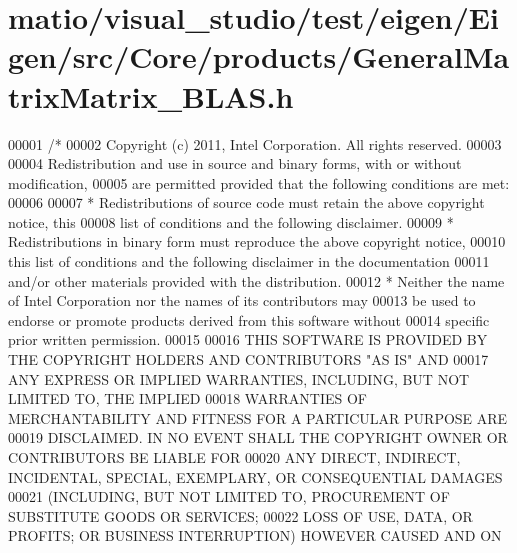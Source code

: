 \hypertarget{matio_2visual__studio_2test_2eigen_2_eigen_2src_2_core_2products_2_general_matrix_matrix___b_l_a_s_8h_source}{}\section{matio/visual\+\_\+studio/test/eigen/\+Eigen/src/\+Core/products/\+General\+Matrix\+Matrix\+\_\+\+B\+L\+AS.h}
\label{matio_2visual__studio_2test_2eigen_2_eigen_2src_2_core_2products_2_general_matrix_matrix___b_l_a_s_8h_source}

\begin{DoxyCode}
00001 \textcolor{comment}{/*}
00002 \textcolor{comment}{ Copyright (c) 2011, Intel Corporation. All rights reserved.}
00003 \textcolor{comment}{}
00004 \textcolor{comment}{ Redistribution and use in source and binary forms, with or without modification,}
00005 \textcolor{comment}{ are permitted provided that the following conditions are met:}
00006 \textcolor{comment}{}
00007 \textcolor{comment}{ * Redistributions of source code must retain the above copyright notice, this}
00008 \textcolor{comment}{   list of conditions and the following disclaimer.}
00009 \textcolor{comment}{ * Redistributions in binary form must reproduce the above copyright notice,}
00010 \textcolor{comment}{   this list of conditions and the following disclaimer in the documentation}
00011 \textcolor{comment}{   and/or other materials provided with the distribution.}
00012 \textcolor{comment}{ * Neither the name of Intel Corporation nor the names of its contributors may}
00013 \textcolor{comment}{   be used to endorse or promote products derived from this software without}
00014 \textcolor{comment}{   specific prior written permission.}
00015 \textcolor{comment}{}
00016 \textcolor{comment}{ THIS SOFTWARE IS PROVIDED BY THE COPYRIGHT HOLDERS AND CONTRIBUTORS "AS IS" AND}
00017 \textcolor{comment}{ ANY EXPRESS OR IMPLIED WARRANTIES, INCLUDING, BUT NOT LIMITED TO, THE IMPLIED}
00018 \textcolor{comment}{ WARRANTIES OF MERCHANTABILITY AND FITNESS FOR A PARTICULAR PURPOSE ARE}
00019 \textcolor{comment}{ DISCLAIMED. IN NO EVENT SHALL THE COPYRIGHT OWNER OR CONTRIBUTORS BE LIABLE FOR}
00020 \textcolor{comment}{ ANY DIRECT, INDIRECT, INCIDENTAL, SPECIAL, EXEMPLARY, OR CONSEQUENTIAL DAMAGES}
00021 \textcolor{comment}{ (INCLUDING, BUT NOT LIMITED TO, PROCUREMENT OF SUBSTITUTE GOODS OR SERVICES;}
00022 \textcolor{comment}{ LOSS OF USE, DATA, OR PROFITS; OR BUSINESS INTERRUPTION) HOWEVER CAUSED AND ON}

\end{DoxyCode}

